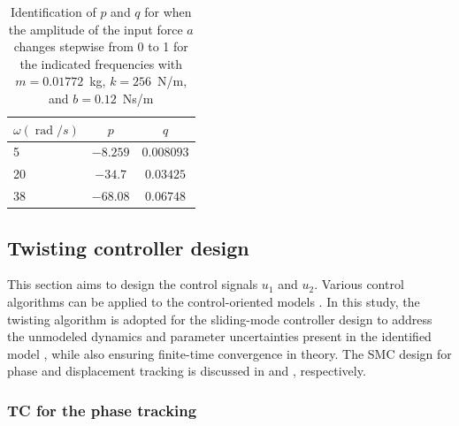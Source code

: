 \documentclass[lettersize,journal]{IEEEtran}
\DeclareMathOperator{\rad}{rad}
\begin{document}
\begin{table}
    \centering 
    \begin{tabular}{|l|c|c|} \hline
       $\omega (\rad/s)$   & $p$ & $q$  \\ \hline
       5   & $-8.259$ & $0.008093$  \\ \hline
         20   & $-34.7$ & $0.03425$  \\ \hline
       38   & $-68.08$ & $0.06748$  \\ \hline
    \end{tabular}
    \vspace{0.1cm}
    \caption{Identification of $p$ and $q$ for  when the amplitude of the input force $a$ changes stepwise from 0 to 1 for the indicated frequencies with $m=0.01772$~kg, $k=256$~N/m, and $b=0.12$~Ns/m}
    \label{T_identification_amplitude}
\end{table}


\subsection{Twisting controller design} \label{S_SMC_design}

This section aims to design the control signals $u_1$ and $u_2$. Various control algorithms can be applied to the control-oriented models . In this study, the twisting algorithm is adopted for the sliding-mode controller design to address the unmodeled dynamics and parameter uncertainties present in the identified model , while also ensuring finite-time convergence in theory. The SMC design for phase and displacement tracking is discussed in  and , respectively.

\subsubsection{TC for the phase tracking} \label{S_SMC_phase}
\end{document}
